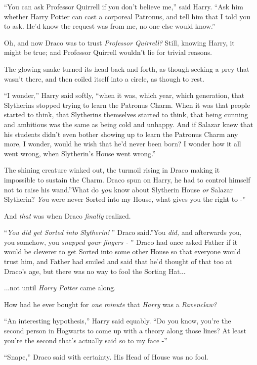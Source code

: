 ``You can ask Professor Quirrell if you don't believe me,'' said Harry.
``Ask him whether Harry Potter can cast a corporeal Patronus, and tell
him that I told you to ask. He'd know the request was from me, no one
else would know.''

Oh, and now Draco was to trust \emph{Professor Quirrell?} Still, knowing
Harry, it might be true; and Professor Quirrell wouldn't lie for trivial
reasons.

The glowing snake turned its head back and forth, as though seeking a
prey that wasn't there, and then coiled itself into a circle, as though
to rest.

``I wonder,'' Harry said softly, ``when it was, which year, which
generation, that Slytherins stopped trying to learn the Patronus Charm.
When it was that people started to think, that Slytherins themselves
started to think, that being cunning and ambitious was the same as being
cold and unhappy. And if Salazar knew that his students didn't even
bother showing up to learn the Patronus Charm any more, I wonder, would
he wish that he'd never been born? I wonder how it all went wrong, when
Slytherin's House went wrong.''

The shining creature winked out, the turmoil rising in Draco making it
impossible to sustain the Charm. Draco spun on Harry, he had to control
himself not to raise his wand.''What do \emph{you} know about Slytherin
House \emph{or} Salazar Slytherin? \emph{You} were never Sorted into my
House, what gives you the right to -''

And \emph{that} was when Draco \emph{finally} realized.

``\emph{You did get Sorted into Slytherin!} '' Draco said.''You
\emph{did,} and afterwards you, you somehow, you \emph{snapped your
fingers -} '' Draco had once asked Father if it would be cleverer to get
Sorted into some other House so that everyone would trust him, and
Father had smiled and said that he'd thought of that too at Draco's age,
but there was no way to fool the Sorting Hat...

...not until \emph{Harry Potter} came along.

How had he ever bought for \emph{one minute} that \emph{Harry} was a
\emph{Ravenclaw?}

``An interesting hypothesis,'' Harry said equably. ``Do you know, you're
the second person in Hogwarts to come up with a theory along those
lines? At least you're the second that's actually said so to my face -''

``Snape,'' Draco said with certainty. His Head of House was no fool.


